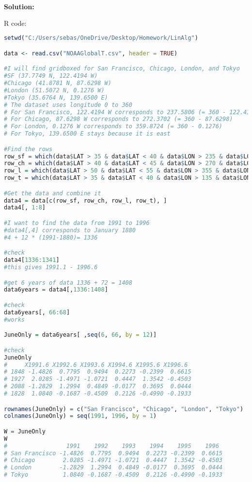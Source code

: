 \documentclass[12pt]{article}
\newenvironment{solution}{
    \textbf{Solution:}
    
}{
    
    \vspace{2em}
}
\begin{document}
\begin{solution}
    R code:
    \begin{lstlisting}[language=R]
setwd("C:/Users/sebas/OneDrive/Desktop/Homework/LinAlg")

data <- read.csv("NOAAGlobalT.csv", header = TRUE)

#I will find gridboxed for San Francisco, Chicago, London, and Tokyo
#SF (37.7749 N, 122.4194 W)
#Chicago (41.8781 N, 87.6298 W)
#London (51.5072 N, 0.1276 W)
#Tokyo (35.6764 N, 139.6500 E)
# The dataset uses longitude 0 to 360
# For San Francisco, 122.4194 W corresponds to 237.5806 (= 360 - 122.4194)
# For Chicago, 87.6298 W corresponds to 272.3702 (= 360 - 87.6298)
# For London, 0.1276 W corresponds to 359.8724 (= 360 - 0.1276)
# For Tokyo, 139.6500 E stays because it is east

#Find the rows
row_sf = which(data$LAT > 35 & data$LAT < 40 & data$LON > 235 & data$LON < 240)
row_ch = which(data$LAT > 40 & data$LAT < 45 & data$LON > 270 & data$LON < 275)
row_l = which(data$LAT > 50 & data$LAT < 55 & data$LON > 355 & data$LON < 360)
row_t = which(data$LAT > 35 & data$LAT < 40 & data$LON > 135 & data$LON < 140)

#Get the data and combine it
data4 = data[c(row_sf, row_ch, row_l, row_t), ]
data4[, 1:8]

#I want to find the data from 1991 to 1996
#data4[,4] corresponds to January 1880
#4 + 12 * (1991-1880)= 1336

#check
data4[1336:1341]
#this gives 1991.1 - 1996.6

#get 6 years of data 1336 + 72 = 1408
data6years = data4[,1336:1408]

#check
data6years[, 66:68]
#works

JuneOnly = data6years[ ,seq(6, 66, by = 12)]

#check
JuneOnly
#     X1991.6 X1992.6 X1993.6 X1994.6 X1995.6 X1996.6
# 1848 -1.4826  0.7795  0.9494  0.2273 -0.2399  0.6615
# 1927  2.0285 -1.4971 -1.0721  0.4447  1.3542 -0.4503
# 2088 -1.2829  1.2994  0.4849 -0.0177  0.3695  0.0444
# 1828  1.0840 -0.1687 -0.4509  0.2126 -0.4990 -0.1933

rownames(JuneOnly) = c("San Francisco", "Chicago", "London", "Tokyo")
colnames(JuneOnly) = seq(1991, 1996, by = 1)

W = JuneOnly
W
#                 1991    1992    1993    1994    1995    1996
# San Francisco -1.4826  0.7795  0.9494  0.2273 -0.2399  0.6615
# Chicago        2.0285 -1.4971 -1.0721  0.4447  1.3542 -0.4503
# London        -1.2829  1.2994  0.4849 -0.0177  0.3695  0.0444
# Tokyo          1.0840 -0.1687 -0.4509  0.2126 -0.4990 -0.1933
    \end{lstlisting}
\end{solution}
\end{document}
